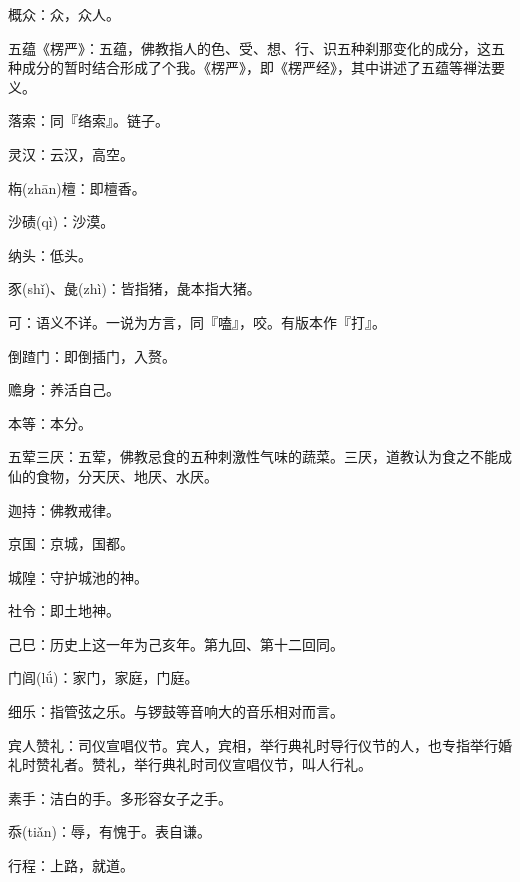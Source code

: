 \startbuffer[332]
概众：众，众人。
\stopbuffer


\startbuffer[333]
五蕴《楞严》：五蕴，佛教指人的色、受、想、行、识五种刹那变化的成分，这五种成分的暂时结合形成了个我。《楞严》，即《楞严经》，其中讲述了五蕴等禅法要义。
\stopbuffer


\startbuffer[334]
落索：同『络索』。链子。
\stopbuffer


\startbuffer[335]
灵汉：云汉，高空。
\stopbuffer


\startbuffer[336]
栴(zhān)檀：即檀香。
\stopbuffer


\startbuffer[337]
沙碛(qì)：沙漠。
\stopbuffer


\startbuffer[338]
纳头：低头。
\stopbuffer


\startbuffer[339]
豕(shǐ)、彘(zhì)：皆指猪，彘本指大猪。
\stopbuffer


\startbuffer[340]
可：语义不详。一说为方言，同『嗑』，咬。有版本作『打』。
\stopbuffer


\startbuffer[341]
倒蹅门：即倒插门，入赘。
\stopbuffer


\startbuffer[342]
赡身：养活自己。
\stopbuffer


\startbuffer[343]
本等：本分。
\stopbuffer


\startbuffer[344]
五荤三厌：五荤，佛教忌食的五种刺激性气味的蔬菜。三厌，道教认为食之不能成仙的食物，分天厌、地厌、水厌。
\stopbuffer


\startbuffer[345]
迦持：佛教戒律。
\stopbuffer


\startbuffer[346]
京国：京城，国都。
\stopbuffer


\startbuffer[347]
城隍：守护城池的神。
\stopbuffer


\startbuffer[348]
社令：即土地神。
\stopbuffer


\startbuffer[349]
己巳：历史上这一年为己亥年。第九回、第十二回同。
\stopbuffer


\startbuffer[350]
门闾(lǘ)：家门，家庭，门庭。
\stopbuffer


\startbuffer[351]
细乐：指管弦之乐。与锣鼓等音响大的音乐相对而言。
\stopbuffer


\startbuffer[352]
宾人赞礼：司仪宣唱仪节。宾人，宾相，举行典礼时导行仪节的人，也专指举行婚礼时赞礼者。赞礼，举行典礼时司仪宣唱仪节，叫人行礼。
\stopbuffer


\startbuffer[353]
素手：洁白的手。多形容女子之手。
\stopbuffer


\startbuffer[354]
忝(tiǎn)：辱，有愧于。表自谦。
\stopbuffer


\startbuffer[355]
行程：上路，就道。
\stopbuffer


